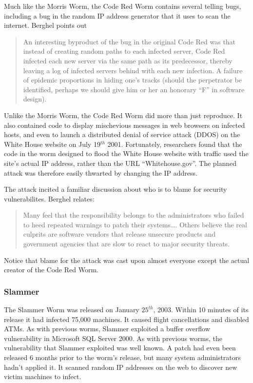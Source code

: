 Much like the Morris Worm, the Code Red Worm contains several telling bugs,
including a bug in the random IP address generator that it uses to scan the internet.
Berghel\cite{berghel_code_2001} points out
\begin{quote}
An interesting byproduct of the bug in the original Code Red was that instead 
of creating random paths to each infected server, Code Red infected each new
server via the same path as its predecessor, thereby leaving a log of infected
servers behind with each new infection. A failure of epidemic proportions in
hiding one's tracks (should the perpetrator be identified, perhaps we should
give him or her an honorary ``F'' in software design).
\end{quote}

Unlike the Morris Worm, the Code Red Worm did more than just reproduce. It also
contained code to display mischevious messages in web browsers on infected
hosts, and even to launch a distributed denial of service attack (DDOS) on the White
House website on July 19$^{th}$ 2001. Fortunately, researchers found that
the code in the worm designed to flood the White House website with traffic used
the site's actual IP address, rather than the URL ``Whitehouse.gov''. The planned
attack was therefore easily thwarted by changing the IP
address\cite{berghel_code_2001}.

The attack incited a familiar discussion about who is to blame for security
vulnerabilites. Berghel\cite{berghel_code_2001} relates:
\begin{quote}
Many feel that the responsibility belongs to the administrators who failed to
heed repeated warnings to patch their systems\ldots.
Others believe the real culprits are software vendors that release unsecure
products and government agencies that are slow to react to major security threats.
\end{quote}

Notice that blame for the attack was cast upon almost everyone
except the actual creator of the Code Red Worm.

\subsubsection*{Slammer}
The Slammer Worm was released on January $25^{th}$, 2003. Within 10 minutes of
its release it had infected 75,000 machines. It caused
flight cancellations and disabled ATMs. As with previous worms, Slammer
exploited a buffer overflow vulnerability in Microsoft SQL Server 2000. As with
previous worms, the vulnerability that Slammer exploited was well known. A
patch had even been released 6 months prior to the worm's release, but many
system administrators hadn't applied it. It scanned random IP addresses on the
web to discover new victim machines to
infect\cite{tynan_dawn_2003}\cite{panko_slammer:_2003}.


